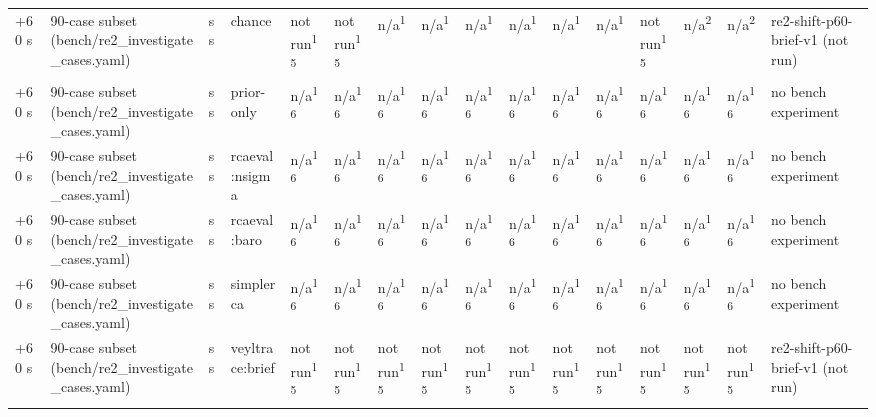 \begin{table}[t]
\begin{tabular}{llllllllllllllll}
+60 s & 90-case subset (bench/re2\_investigate\_cases.yaml) & ss & chance & not run\textsuperscript{15} & not run\textsuperscript{15} & n/a\textsuperscript{1} & n/a\textsuperscript{1} & n/a\textsuperscript{1} & n/a\textsuperscript{1} & n/a\textsuperscript{1} & n/a\textsuperscript{1} & not run\textsuperscript{15} & n/a\textsuperscript{2} & n/a\textsuperscript{2} & re2-shift-p60-brief-v1 (not run) \\
+60 s & 90-case subset (bench/re2\_investigate\_cases.yaml) & ss & prior-only & n/a\textsuperscript{16} & n/a\textsuperscript{16} & n/a\textsuperscript{16} & n/a\textsuperscript{16} & n/a\textsuperscript{16} & n/a\textsuperscript{16} & n/a\textsuperscript{16} & n/a\textsuperscript{16} & n/a\textsuperscript{16} & n/a\textsuperscript{16} & n/a\textsuperscript{16} & no bench experiment \\
+60 s & 90-case subset (bench/re2\_investigate\_cases.yaml) & ss & rcaeval:nsigma & n/a\textsuperscript{16} & n/a\textsuperscript{16} & n/a\textsuperscript{16} & n/a\textsuperscript{16} & n/a\textsuperscript{16} & n/a\textsuperscript{16} & n/a\textsuperscript{16} & n/a\textsuperscript{16} & n/a\textsuperscript{16} & n/a\textsuperscript{16} & n/a\textsuperscript{16} & no bench experiment \\
+60 s & 90-case subset (bench/re2\_investigate\_cases.yaml) & ss & rcaeval:baro & n/a\textsuperscript{16} & n/a\textsuperscript{16} & n/a\textsuperscript{16} & n/a\textsuperscript{16} & n/a\textsuperscript{16} & n/a\textsuperscript{16} & n/a\textsuperscript{16} & n/a\textsuperscript{16} & n/a\textsuperscript{16} & n/a\textsuperscript{16} & n/a\textsuperscript{16} & no bench experiment \\
+60 s & 90-case subset (bench/re2\_investigate\_cases.yaml) & ss & simplerca & n/a\textsuperscript{16} & n/a\textsuperscript{16} & n/a\textsuperscript{16} & n/a\textsuperscript{16} & n/a\textsuperscript{16} & n/a\textsuperscript{16} & n/a\textsuperscript{16} & n/a\textsuperscript{16} & n/a\textsuperscript{16} & n/a\textsuperscript{16} & n/a\textsuperscript{16} & no bench experiment \\
+60 s & 90-case subset (bench/re2\_investigate\_cases.yaml) & ss & veyltrace:brief & not run\textsuperscript{15} & not run\textsuperscript{15} & not run\textsuperscript{15} & not run\textsuperscript{15} & not run\textsuperscript{15} & not run\textsuperscript{15} & not run\textsuperscript{15} & not run\textsuperscript{15} & not run\textsuperscript{15} & not run\textsuperscript{15} & not run\textsuperscript{15} & re2-shift-p60-brief-v1 (not run) \\

\end{tabular}
\end{table}
